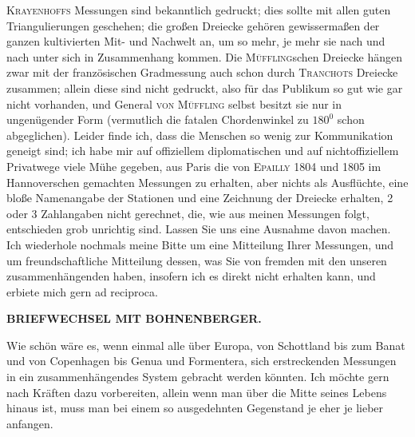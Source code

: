 \textsc{Krayenhoffs} Messungen sind bekanntlich gedruckt; dies sollte mit allen guten Triangulierungen geschehen; die großen Dreiecke gehören gewissermaßen der ganzen kultivierten Mit- und Nachwelt an, um so mehr, je mehr sie nach und nach unter sich in Zusammenhang kommen.
Die \textsc{Müffling}schen Dreiecke hängen zwar mit der französischen Gradmessung auch schon durch \textsc{Tranchots} Dreiecke zusammen; allein diese sind nicht gedruckt, also für das Publikum so gut wie gar nicht vorhanden, und General \textsc{von Müffling} selbst besitzt sie nur in ungenügender Form (vermutlich die fatalen Chordenwinkel zu \(180^{0}\) schon abgeglichen).
Leider finde ich, dass die Menschen so wenig zur Kommunikation geneigt sind; ich habe mir auf offiziellem diplomatischen und auf nichtoffiziellem Privatwege viele Mühe gegeben, aus Paris die von \textsc{Epailly} 1804 und 1805 im Hannoverschen gemachten Messungen zu erhalten, aber nichts als Ausflüchte, eine bloße Namenangabe der Stationen und eine Zeichnung der Dreiecke erhalten, 2 oder 3 Zahlangaben nicht gerechnet, die, wie aus meinen Messungen folgt, entschieden grob unrichtig sind.
Lassen Sie uns eine Ausnahme davon machen.
Ich wiederhole nochmals meine Bitte um eine Mitteilung Ihrer Messungen, und um freundschaftliche Mitteilung dessen, was Sie von fremden mit den unseren zusammenhängenden haben, insofern ich es direkt nicht erhalten kann, und erbiete mich gern ad reciproca.
\par\clearpage
\noindent{}\hfill{\small\textbf{BRIEFWECHSEL MIT BOHNENBERGER.}}\hfill\null\par\medskip
\noindent Wie schön wäre es, wenn einmal alle über Europa, von Schottland bis zum Banat und von Copenhagen bis Genua und Formentera, sich erstreckenden Messungen in ein zusammenhängendes System gebracht werden könnten.
Ich möchte gern nach Kräften dazu vorbereiten, allein wenn man über die Mitte seines Lebens hinaus ist, muss man bei einem so ausgedehnten Gegenstand je eher je lieber anfangen.


